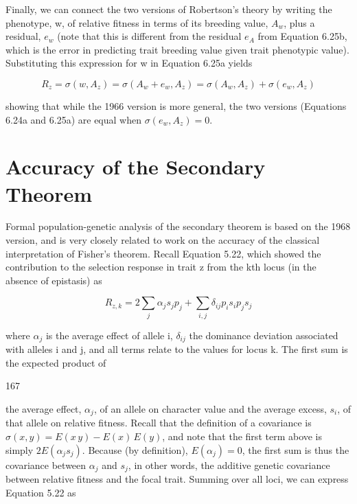\documentclass{article}
\begin{document}
Finally, we can connect the two versions of Robertson's theory by writing the phenotype, w, of relative fitness in terms of its breeding value,  $ A_w $, plus a residual,  $ e_w $ (note that this is different from the residual  $ e_A $ from Equation 6.25b, which is the error in predicting trait breeding value given trait phenotypic value). Substituting this expression for w in Equation 6.25a yields

\begin{equation}
R_{z}=\sigma(w,A_{z})=\sigma(A_{w}+e_{w},A_{z})=\sigma(A_{w},A_{z})+\sigma(e_{w},A_{z})
\tag{6.25c}
\label{eq:6_25c}
\end{equation}

showing that while the 1966 version is more general, the two versions (Equations 6.24a and 6.25a) are equal when  $ \sigma(e_w, A_z) = 0 $.

\section{Accuracy of the Secondary Theorem}
Formal population-genetic analysis of the secondary theorem is based on the 1968 version, and is very closely related to work on the accuracy of the classical interpretation of Fisher's theorem. Recall Equation 5.22, which showed the contribution to the selection response in trait z from the kth locus (in the absence of epistasis) as

\begin{equation}
R_{z,k}=2\sum_{j}\alpha_{j}s_{j}p_{j}+\sum_{i,j}\delta_{ij}p_{i}s_{i}p_{j}s_{j}
\end{equation}

where  $ \alpha_{j} $ is the average effect of allele i,  $ \delta_{ij} $ the dominance deviation associated with alleles i and j, and all terms relate to the values for locus k. The first sum is the expected product of

167

the average effect,  $ \alpha_{j} $, of an allele on character value and the average excess,  $ s_{i} $, of that allele on relative fitness. Recall that the definition of a covariance is  $ \sigma(x,y) = E(x\,y) - E(x)\,E(y) $, and note that the first term above is simply  $ 2E(\alpha_{j}s_{j}) $. Because (by definition),  $ E(\alpha_{j}) = 0 $, the first sum is thus the covariance between  $ \alpha_{j} $ and  $ s_{j} $, in other words, the additive genetic covariance between relative fitness and the focal trait. Summing over all loci, we can express Equation 5.22 as
\end{document}
